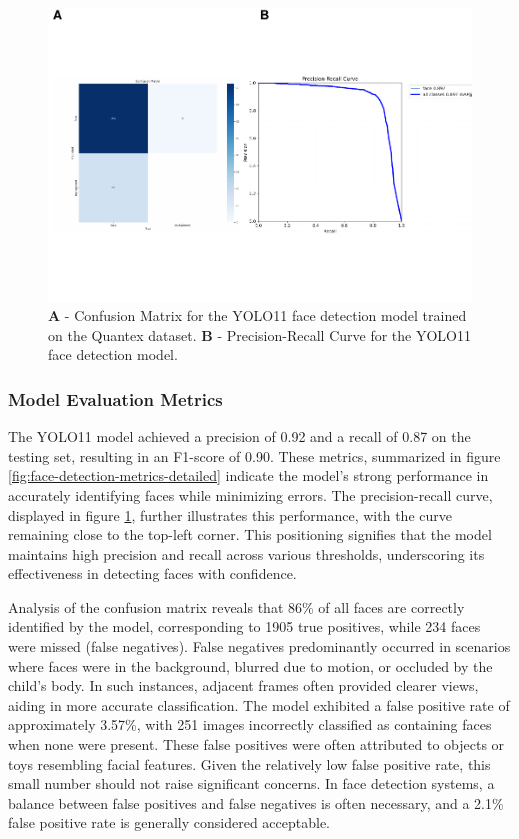 \documentclass[
  man,floatsintext]{apa6}
\begin{document}
\begin{figure}

{\centering \includegraphics{Quantex_interaction_paper_files/figure-latex/face-metrics-1} 

}

\caption{\textbf{A} - Confusion Matrix for the YOLO11 face detection model trained on the Quantex dataset. \textbf{B} - Precision-Recall Curve for the YOLO11 face detection model.}\label{fig:face-metrics}
\end{figure}

\subsubsection{Model Evaluation Metrics}\label{model-evaluation-metrics}

The YOLO11 model achieved a precision of 0.92 and a recall of 0.87 on the testing set, resulting in an F1-score of 0.90. These metrics, summarized in figure \ref{fig:face-detection-metrics-detailed} indicate the model's strong performance in accurately identifying faces while minimizing errors. The precision-recall curve, displayed in figure \ref{fig:face-metrics}, further illustrates this performance, with the curve remaining close to the top-left corner. This positioning signifies that the model maintains high precision and recall across various thresholds, underscoring its effectiveness in detecting faces with confidence.

Analysis of the confusion matrix reveals that 86\% of all faces are correctly identified by the model, corresponding to 1905 true positives, while 234 faces were missed (false negatives). False negatives predominantly occurred in scenarios where faces were in the background, blurred due to motion, or occluded by the child's body. In such instances, adjacent frames often provided clearer views, aiding in more accurate classification. The model exhibited a false positive rate of approximately 3.57\%, with 251 images incorrectly classified as containing faces when none were present. These false positives were often attributed to objects or toys resembling facial features. Given the relatively low false positive rate, this small number should not raise significant concerns. In face detection systems, a balance between false positives and false negatives is often necessary, and a 2.1\% false positive rate is generally considered acceptable.
\end{document}
